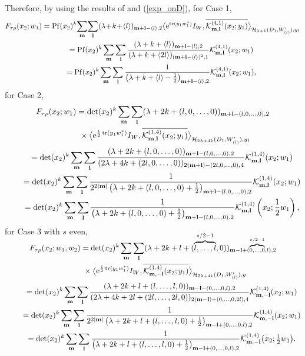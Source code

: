 \documentclass[pdftex]{sigma}
\numberwithin{equation}{section}
\newcommand{\bl}{\mathbf{l}}
\newcommand{\bm}{\mathbf{m}}
\newcommand{\cH}{\mathcal{H}}
\newcommand{\cK}{\mathcal{K}}
\newcommand{\tr}{\operatorname{tr}}
\newcommand{\Pf}{\operatorname{Pf}}
\begin{document}
Therefore, by using the results of \cite{N2} and (\ref{exp_onD}), for Case 1,
\begin{gather*}
 F_{\tau\rho}(x_2;w_1) =\Pf(x_2)^k\! \sum_\bm\!\sum_\bl (\lambda\!+\!k\!+\!\langle l\rangle)_{\bm{+}\bl{-}\langle l\rangle,2}
\big\langle {\rm e}^{\tr(y_1w_1^*)}I_W,\overline{\cK_{\bm,\bl}^{(4,1)}(x_2;y_1)} \big\rangle_{\cH_{\lambda{+}k}(D_1,W_{(l)}'),y_1} \\
\qquad{} =\Pf(x_2)^k\sum_\bm\sum_\bl \frac{(\lambda+k+\langle l\rangle)_{\bm+\bl-\langle l\rangle,2}}{(\lambda+k+\langle 2l\rangle)_{(\bm+\bl-\langle l\rangle)^2,1}}
\cK_{\bm,\bl}^{(4,1)}(x_2;w_1) \\
\qquad{} =\Pf(x_2)^k\sum_\bm\sum_\bl \frac{1}{\left(\lambda+k+\langle l\rangle-\frac{1}{2}\right)_{\bm+\bl-\langle l\rangle,2}}\cK_{\bm,\bl}^{(4,1)}(x_2;w_1),
\end{gather*}
for Case 2,
\begin{gather*}
 F_{\tau\rho}(x_2;w_1) =\det(x_2)^{k}\sum_\bm\sum_\bl (\lambda+2k+(l,0,\ldots,0))_{\bm+\bl-(l,0,\ldots,0),2}\\
\qquad\quad{} \times\bigl\langle {\rm e}^{\frac{1}{2}\tr(y_1w_1^*)}I_W,\overline{\cK_{\bm,\bl}^{(1,4)}(x_2;y_1)}
\bigr\rangle_{\cH_{2\lambda+4k}(D_1,W_{(l)}'),y_1} \\
\qquad{} =\det(x_2)^{k}\sum_\bm\sum_\bl
\frac{(\lambda+2k+(l,0,\ldots,0))_{\bm+\bl-(l,0,\ldots,0),2}}{(2\lambda+4k+(2l,0,\ldots,0))_{2(\bm+\bl)-(2l,0,\ldots,0),4}}
\cK_{\bm,\bl}^{(1,4)}(x_2;w_1)\\
\qquad{} =\det(x_2)^{k}\sum_\bm\sum_\bl
\frac{1}{2^{2|\bm|}\left(\lambda+2k+(l,0,\ldots,0)+\frac{1}{2}\right)_{\bm+\bl-(l,0,\ldots,0),2}}\cK_{\bm,\bl}^{(1,4)}(x_2;w_1)\\
\qquad{} =\det(x_2)^{k}\sum_\bm\sum_\bl
\frac{1}{\left(\lambda+2k+(l,0,\ldots,0)+\frac{1}{2}\right)_{\bm+\bl-(l,0,\ldots,0),2}}\cK_{\bm,\bl}^{(1,4)}\left(x_2;\frac{1}{2}w_1\right),
\end{gather*}
for Case 3 with $s$ even,
\begin{gather*}
 F_{\tau\rho}(x_2;w_1,w_2) =\det(x_2)^{k}\sum_\bm\sum_\bl (\lambda+2k+l+(\smash{\overbrace{l,\ldots,l}^{s/2-1}},0))_{\bm-\bl
+(\smash{\overbrace{\scriptstyle 0,\ldots,0}^{s/2-1}},l),2}\\
\qquad\quad{} \times\bigl\langle {\rm e}^{\frac{1}{2}\tr(y_1w_1^*)}I_W,\overline{\cK_{\bm,-\bl}^{(1,4)}(x_2;y_1)}
\bigr\rangle_{\cH_{2\lambda+4k}(D_1,W_{(l)}'),y} \\
\qquad{} =\det(x_2)^{k}\sum_\bm\sum_\bl
\frac{(\lambda+2k+l+(l,\ldots,l,0))_{\bm-\bl-(0,\ldots,0,l),2}}{(2\lambda+4k+2l+(2l,\ldots,2l,0))_{2(\bm-\bl)+(0,\ldots,0,2l),4}}
\cK_{\bm,-\bl}^{(1,4)}(x_2;w_1)\\
\qquad{} =\det(x_2)^{k}\sum_\bm\sum_\bl
\frac{1}{2^{2|\bm|}\left(\lambda+2k+l+(l,\ldots,l,0)+\frac{1}{2}\right)_{\bm-\bl+(0,\ldots,0,l),2}}\cK_{\bm,-\bl}^{(1,4)}(x_2;w_1)\\
\qquad{} =\det(x_2)^{k}\sum_\bm\sum_\bl
\frac{1}{\left(\lambda+2k+l+(l,\ldots,l,0)+\frac{1}{2}\right)_{\bm-\bl+(0,\ldots,0,l),2}}\cK_{\bm,-\bl}^{(1,4)}\big(x_2;\tfrac{1}{2}w_1\big).
\end{gather*}
\end{document}
